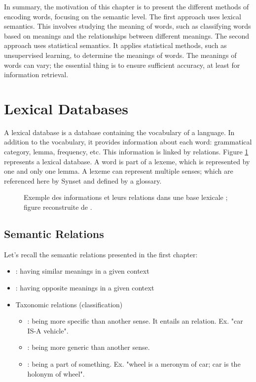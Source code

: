 \documentclass{KBook}
\begin{document}
In summary, the motivation of this chapter is to present the different methods of encoding words, focusing on the semantic level. The first approach uses lexical semantics. This involves studying the meaning of words, such as classifying words based on meanings and the relationships between different meanings. The second approach uses statistical semantics. It applies statistical methods, such as unsupervised learning, to determine the meanings of words. The meanings of words can vary; the essential thing is to ensure sufficient accuracy, at least for information retrieval.

\section{Lexical Databases}

A lexical database is a database containing the vocabulary of a language. In addition to the vocabulary, it provides information about each word: grammatical category, lemma, frequency, etc. This information is linked by relations. Figure \ref{fig:base-lex-exp} represents a lexical database. A word is part of a lexeme, which is represented by one and only one lemma. A lexeme can represent multiple senses; which are referenced here by Synset and defined by a glossary.
 
\begin{figure}[ht]
	\centering 
	\caption[Exemple des informations et leurs relations dans une base lexicale.]{Exemple des informations et leurs relations dans une base lexicale ; figure reconstruite de \cite{2019-white-al}.}
	\label{fig:base-lex-exp}
\end{figure}

\subsection{Semantic Relations}

Let's recall the semantic relations presented in the first chapter:
\begin{itemize}
	\item {}: having similar meanings in a given context
	\item {}: having opposite meanings in a given context
	\item Taxonomic relations (classification)
	\begin{itemize}
		\item {}: being more specific than another sense. It entails an  relation. Ex. "car IS-A vehicle".
		\item {}: being more generic than another sense.
		\item {}: being a part of something. Ex. "wheel is a meronym of car; car is the holonym of wheel".
	\end{itemize}
\end{itemize}
\end{document}
